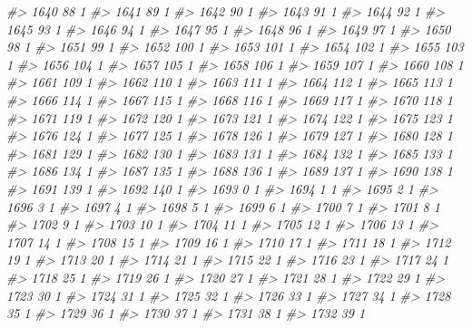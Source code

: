 \documentclass[]{article}
\newenvironment{Shaded}{\begin{snugshade}}{\end{snugshade}}
\newcommand{\CommentTok}[1]{\textcolor[rgb]{0.56,0.35,0.01}{\textit{#1}}}
\begin{document}
\begin{Shaded}
\begin{Highlighting}[]
\CommentTok{#> 1640  88  1}
\CommentTok{#> 1641  89  1}
\CommentTok{#> 1642  90  1}
\CommentTok{#> 1643  91  1}
\CommentTok{#> 1644  92  1}
\CommentTok{#> 1645  93  1}
\CommentTok{#> 1646  94  1}
\CommentTok{#> 1647  95  1}
\CommentTok{#> 1648  96  1}
\CommentTok{#> 1649  97  1}
\CommentTok{#> 1650  98  1}
\CommentTok{#> 1651  99  1}
\CommentTok{#> 1652 100  1}
\CommentTok{#> 1653 101  1}
\CommentTok{#> 1654 102  1}
\CommentTok{#> 1655 103  1}
\CommentTok{#> 1656 104  1}
\CommentTok{#> 1657 105  1}
\CommentTok{#> 1658 106  1}
\CommentTok{#> 1659 107  1}
\CommentTok{#> 1660 108  1}
\CommentTok{#> 1661 109  1}
\CommentTok{#> 1662 110  1}
\CommentTok{#> 1663 111  1}
\CommentTok{#> 1664 112  1}
\CommentTok{#> 1665 113  1}
\CommentTok{#> 1666 114  1}
\CommentTok{#> 1667 115  1}
\CommentTok{#> 1668 116  1}
\CommentTok{#> 1669 117  1}
\CommentTok{#> 1670 118  1}
\CommentTok{#> 1671 119  1}
\CommentTok{#> 1672 120  1}
\CommentTok{#> 1673 121  1}
\CommentTok{#> 1674 122  1}
\CommentTok{#> 1675 123  1}
\CommentTok{#> 1676 124  1}
\CommentTok{#> 1677 125  1}
\CommentTok{#> 1678 126  1}
\CommentTok{#> 1679 127  1}
\CommentTok{#> 1680 128  1}
\CommentTok{#> 1681 129  1}
\CommentTok{#> 1682 130  1}
\CommentTok{#> 1683 131  1}
\CommentTok{#> 1684 132  1}
\CommentTok{#> 1685 133  1}
\CommentTok{#> 1686 134  1}
\CommentTok{#> 1687 135  1}
\CommentTok{#> 1688 136  1}
\CommentTok{#> 1689 137  1}
\CommentTok{#> 1690 138  1}
\CommentTok{#> 1691 139  1}
\CommentTok{#> 1692 140  1}
\CommentTok{#> 1693   0  1}
\CommentTok{#> 1694   1  1}
\CommentTok{#> 1695   2  1}
\CommentTok{#> 1696   3  1}
\CommentTok{#> 1697   4  1}
\CommentTok{#> 1698   5  1}
\CommentTok{#> 1699   6  1}
\CommentTok{#> 1700   7  1}
\CommentTok{#> 1701   8  1}
\CommentTok{#> 1702   9  1}
\CommentTok{#> 1703  10  1}
\CommentTok{#> 1704  11  1}
\CommentTok{#> 1705  12  1}
\CommentTok{#> 1706  13  1}
\CommentTok{#> 1707  14  1}
\CommentTok{#> 1708  15  1}
\CommentTok{#> 1709  16  1}
\CommentTok{#> 1710  17  1}
\CommentTok{#> 1711  18  1}
\CommentTok{#> 1712  19  1}
\CommentTok{#> 1713  20  1}
\CommentTok{#> 1714  21  1}
\CommentTok{#> 1715  22  1}
\CommentTok{#> 1716  23  1}
\CommentTok{#> 1717  24  1}
\CommentTok{#> 1718  25  1}
\CommentTok{#> 1719  26  1}
\CommentTok{#> 1720  27  1}
\CommentTok{#> 1721  28  1}
\CommentTok{#> 1722  29  1}
\CommentTok{#> 1723  30  1}
\CommentTok{#> 1724  31  1}
\CommentTok{#> 1725  32  1}
\CommentTok{#> 1726  33  1}
\CommentTok{#> 1727  34  1}
\CommentTok{#> 1728  35  1}
\CommentTok{#> 1729  36  1}
\CommentTok{#> 1730  37  1}
\CommentTok{#> 1731  38  1}
\CommentTok{#> 1732  39  1}

\end{Highlighting}
\end{Shaded}
\end{document}
